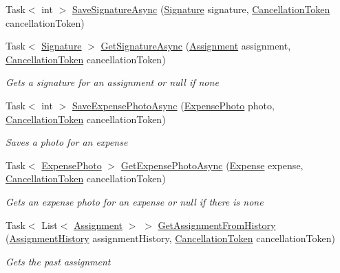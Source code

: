 \begin{DoxyCompactItemize}
Task$<$ int $>$ \hyperlink{class_field_service_1_1_tests_1_1_mocks_1_1_mock_assignment_service_abac1de693ed19c9e8bbab3f9ded2933b}{Save\+Signature\+Async} (\hyperlink{class_field_service_1_1_data_1_1_signature}{Signature} signature, \hyperlink{_view_models_2_assignment_view_model_8cs_aba80ec766846c61f55644fd23860cb18}{Cancellation\+Token} cancellation\+Token)
\item 
Task$<$ \hyperlink{class_field_service_1_1_data_1_1_signature}{Signature} $>$ \hyperlink{class_field_service_1_1_tests_1_1_mocks_1_1_mock_assignment_service_ab78a29325b1035b317908639ef7515f9}{Get\+Signature\+Async} (\hyperlink{class_field_service_1_1_data_1_1_assignment}{Assignment} assignment, \hyperlink{_view_models_2_assignment_view_model_8cs_aba80ec766846c61f55644fd23860cb18}{Cancellation\+Token} cancellation\+Token)
\begin{DoxyCompactList}\small\item\em Gets a signature for an assignment or null if none \end{DoxyCompactList}\item 
Task$<$ int $>$ \hyperlink{class_field_service_1_1_tests_1_1_mocks_1_1_mock_assignment_service_afc281f5de453a4a4152cb6ff40912b57}{Save\+Expense\+Photo\+Async} (\hyperlink{class_field_service_1_1_data_1_1_expense_photo}{Expense\+Photo} photo, \hyperlink{_view_models_2_assignment_view_model_8cs_aba80ec766846c61f55644fd23860cb18}{Cancellation\+Token} cancellation\+Token)
\begin{DoxyCompactList}\small\item\em Saves a photo for an expense \end{DoxyCompactList}\item 
Task$<$ \hyperlink{class_field_service_1_1_data_1_1_expense_photo}{Expense\+Photo} $>$ \hyperlink{class_field_service_1_1_tests_1_1_mocks_1_1_mock_assignment_service_a53136de44941f01def4fd3c68284b479}{Get\+Expense\+Photo\+Async} (\hyperlink{class_field_service_1_1_data_1_1_expense}{Expense} expense, \hyperlink{_view_models_2_assignment_view_model_8cs_aba80ec766846c61f55644fd23860cb18}{Cancellation\+Token} cancellation\+Token)
\begin{DoxyCompactList}\small\item\em Gets an expense photo for an expense or null if there is none \end{DoxyCompactList}\item 
Task$<$ List$<$ \hyperlink{class_field_service_1_1_data_1_1_assignment}{Assignment} $>$ $>$ \hyperlink{class_field_service_1_1_tests_1_1_mocks_1_1_mock_assignment_service_a2e09dd04ff09414886575397522e7d95}{Get\+Assignment\+From\+History} (\hyperlink{class_field_service_1_1_data_1_1_assignment_history}{Assignment\+History} assignment\+History, \hyperlink{_view_models_2_assignment_view_model_8cs_aba80ec766846c61f55644fd23860cb18}{Cancellation\+Token} cancellation\+Token)
\begin{DoxyCompactList}\small\item\em Gets the past assignment \end{DoxyCompactList}\end{DoxyCompactItemize}



